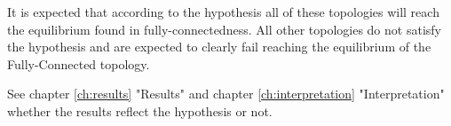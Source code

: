 \documentclass[Bachelorarbeit.tex]{subfiles}
\begin{document}
It is expected that according to the hypothesis all of these topologies will reach the equilibrium found in fully-connectedness. All other topologies do not satisfy the hypothesis and are expected to clearly fail reaching the equilibrium of the Fully-Connected topology.

\medskip

See chapter \ref{ch:results} "Results" and chapter \ref{ch:interpretation} "Interpretation" whether the results reflect the hypothesis or not. 
\end{document}
